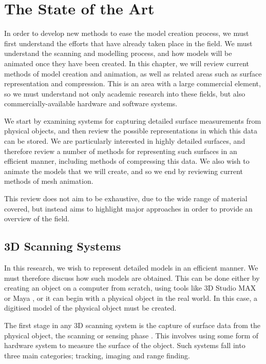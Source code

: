 \chapter{\label{sec:litreview}The State of the Art}

In order to develop new methods to ease the model creation process, we must first understand the efforts that have already taken place in the field. We must understand the scanning and modelling process, and how models will be animated once they have been created. In this chapter, we will review current methods of model creation and animation, as well as related areas such as surface representation and compression. This is an area with a large commercial element, so we must understand not only academic research into these fields, but also commercially-available hardware and software systems. 

We start by examining systems for capturing detailed surface measurements from physical objects, and then review the possible representations in which this data can be stored. We are particularly interested in highly detailed surfaces, and therefore review a number of methods for representing such surfaces in an efficient manner, including methods of compressing this data. We also wish to animate the models that we will create, and so we end by reviewing current methods of mesh animation.

This review does not aim to be exhaustive, due to the wide range of material covered, but instead aims to highlight major approaches in order to provide an overview of the field.

\section{\label{sec:litreview:scanning}3D Scanning Systems}
In  this research, we wish to represent detailed models in an efficient manner. We must therefore discuss how such models are obtained. This can be done either by creating an object on a computer from scratch, using tools like 3D Studio MAX \cite{3DSMAX} or Maya \cite{Maya}, or it can begin with a physical object in the real world. In this case, a digitised model of the physical object must be created.

The first stage in any 3D scanning system is the capture of surface data from the physical object, the scanning or sensing phase \cite{Isdale98}. This involves using some form of hardware system to measure the surface of the object. Such systems fall into three main categories; tracking, imaging and range finding.

